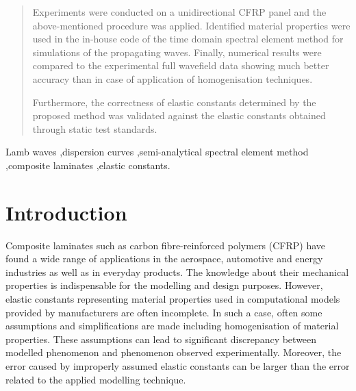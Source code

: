 \documentclass[preprint,12pt]{elsarticle}
\begin{document}
\begin{frontmatter}
\begin{abstract}
Experiments were conducted on a unidirectional CFRP panel and the above-mentioned procedure was applied. 
Identified material properties were used in the in-house code of the time domain spectral element method for simulations of the propagating waves. 
Finally, numerical results were compared to the experimental full wavefield data showing much better accuracy than in case of application of homogenisation techniques.

Furthermore, the correctness of elastic constants determined by the proposed method was validated against the elastic constants obtained through static test standards.
\end{abstract}
		
		\begin{keyword}
			Lamb waves \sep dispersion curves \sep semi-analytical spectral element method \sep composite laminates \sep elastic constants.
			
			
		\end{keyword}
		
	\end{frontmatter}
	
	
\section{Introduction}
Composite laminates such as carbon fibre-reinforced polymers (CFRP) have found a wide range of applications in the aerospace, automotive and energy industries as well as in everyday products. The knowledge about their mechanical properties is indispensable for the modelling and design purposes.
However, elastic constants representing material properties used in computational models provided by manufacturers are often incomplete. 
In such a case, often some assumptions and simplifications are made including homogenisation of material properties. 
These assumptions can lead to significant discrepancy between modelled phenomenon and phenomenon observed experimentally.
Moreover, the error caused by improperly assumed elastic constants can be larger than the error related to the applied modelling technique.	
\end{document}
